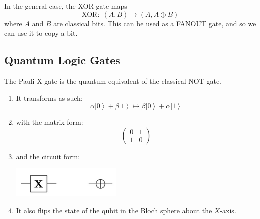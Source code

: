 \documentclass{article}
\newcommand{\ket}[1]{\ensuremath{\left|#1\right\rangle}}
\begin{document}
    \begin{definition}
      In the general case, the XOR gate maps
      \begin{equation} 
        \text{XOR}: \; (A, B) \mapsto (A, A \oplus B)
      \end{equation}
      where $A$ and $B$ are classical bits. This can be used as a FANOUT gate, and so we can use it to copy a bit. 
    \end{definition}

  \subsection{Quantum Logic Gates}

    \begin{definition}[Pauli X]
      The Pauli X gate is the quantum equivalent of the classical NOT gate. 
      \begin{enumerate} 
        \item It transforms as such: 
          \begin{equation} 
            \alpha \ket{0} + \beta \ket{1} \mapsto \beta \ket{0} + \alpha \ket{1}
          \end{equation}
        \item with the matrix form: 
          \begin{equation} 
            \begin{pmatrix} 0 & 1 \\ 1 & 0 \end{pmatrix}
          \end{equation}
        \item and the circuit form: 
          \begin{center}
            \includegraphics[scale=0.5]{img/Pauli_X_gate.png}
          \end{center}
        \item It also flips the state of the qubit in the Bloch sphere about the $X$-axis. 
      \end{enumerate}
    \end{definition}
\end{document}
